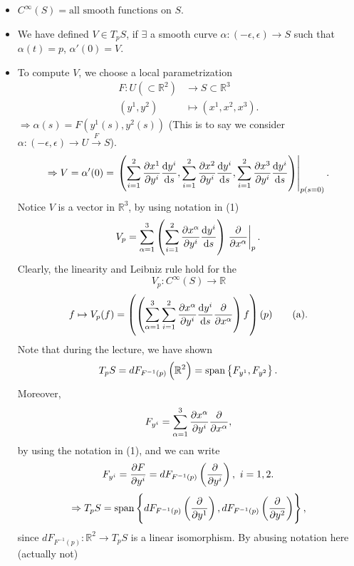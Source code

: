 \begin{enumerate}[(1)]
\begin{itemize}
        \item \(C^\infty(S)={\text{all smooth functions on }S}\).
        \item We have defined \(V\in T_p S\), if \(\exists\) a smooth
        curve \(\alpha\colon (-\epsilon,\epsilon)\to S\) such that
        \(\alpha(t)=p\), \(\alpha'(0)=V\).
        \item To compute \(V\), we choose a local parametrization
        \begin{align*}
            F\colon U(\subset \mathbb{R}^2) &\longrightarrow S\subset \mathbb{R}^3\\
            (y^1,y^2) &\longmapsto (x^1,x^2,x^3)
        .\end{align*}
        \(\Rightarrow \alpha(s)=F\left(y^1(s),y^2(s)\right)\) (This is to 
        say we consider 
        \(\alpha\colon(-\epsilon,\epsilon)\to U
        \mathop{\longrightarrow }\limits^{F} S\)).
        \[
            \Rightarrow V=\alpha'(0)=\left.
            \left(
            \sum_{i=1}^2\pdv{x^1}{y^i}\dv{y^i}{s},
            \sum_{i=1}^2\pdv{x^2}{y^i}\dv{y^i}{s},
            \sum_{i=1}^2\pdv{x^3}{y^i}\dv{y^i}{s}
            \right)
            \right|_{p(s=0)}.
        \]
        Notice \(V\) is a vector in \(\mathbb{R}^3\), by using notation
        in (1)
        \[
            V_p=\sum_{\alpha=1}^3\left(\sum_{i=1}^2\pdv{x^\alpha}{y^i}
            \dv{y^i}{s}\right)\left. \pdv{x^\alpha}  \right|_p.
        \]
        Clearly, the linearity and Leibniz rule hold for the 
        \[
            V_p\colon C^\infty(S)\to \mathbb{R}    
        \]
        \[
            f\mapsto V_p(f)=\left(\left(\sum_{\alpha=1}^3 \sum_{i=1}
            ^2 \pdv{x^\alpha}{y^i}\dv{y^i}{s}\pdv{x^\alpha}\right)f\right)
            (p)   \tag{a} 
        .\]
        Note that during the lecture, we have shown
        \[
            T_pS=dF_{F^{-1}(p)}\left(\mathbb{R}^2\right)=\operatorname{span}
            \left\{F_{y^1},F_{y^2}\right\}    .
        \]
        Moreover, 
        \[
            F_{y^i}=\sum_{\alpha=1}^3\pdv{x^\alpha}{y^i}\pdv
            {x^\alpha},
        \] 
        by using the notation in (1), and we can write
        \[
            F_{y^i}=\pdv{F}{y^i}=dF_{F^{-1}(p)}\left(\pdv{y^i}\right),
            ~i=1,2.
        \]
        \[
            \Rightarrow T_p S=\operatorname{span}\left\{
                dF_{F^{-1}(p)}\left(\pdv{y^1}\right),
                dF_{F^{-1}(p)}\left(\pdv{y^2}\right)
            \right\}  ,
        \]
        since \(dF_{F^{-1}(p)}\colon \mathbb{R}^2\to T_p S\) is a linear
        isomorphism. By abusing notation here (actually not)

\end{itemize}
\end{enumerate}
